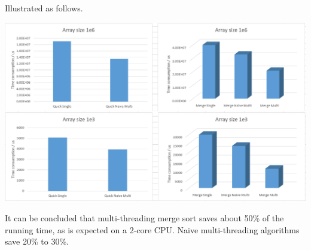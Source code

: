 \begin{homeworkProblem}
Illustrated as follows.

\includegraphics[width=1\columnwidth]{sort}

It can be concluded that multi-threading merge sort saves about 50\% of the running time, as is expected on a 2-core CPU. Naive multi-threading algorithms save 20\% to 30\%.


\end{homeworkProblem}






